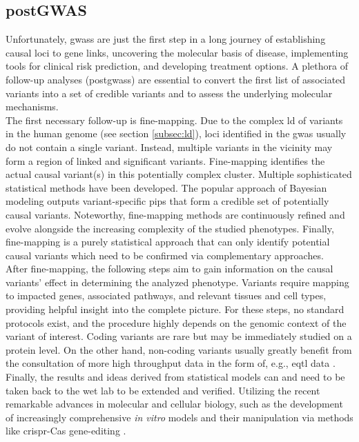     \subsection{postGWAS}
    \label{subsec:gwas_limit}
    Unfortunately, \acp{gwas} are just the first step in a long journey of establishing causal loci to gene links, uncovering the molecular basis of disease, implementing tools for clinical risk prediction, and developing treatment options. A plethora of follow-up analyses (post\acp{gwas}) are essential to convert the first list of associated variants into a set of credible variants and to assess the underlying molecular mechanisms.\\
    The first necessary follow-up is fine-mapping. Due to the complex \ac{ld} of variants in the human genome (see section \ref{subsec:ld}), loci identified in the \ac{gwas} usually do not contain a single variant. Instead, multiple variants in the vicinity may form a region of linked and significant variants. Fine-mapping identifies the actual causal variant(s) in this potentially complex cluster. Multiple sophisticated statistical methods have been developed. The popular approach of Bayesian modeling outputs variant-specific \acp{pip} that form a credible set of potentially causal variants. Noteworthy, fine-mapping methods are continuously refined and evolve alongside the increasing complexity of the studied phenotypes. Finally, fine-mapping is a purely statistical approach that can only identify potential causal variants which need to be confirmed via complementary approaches. \cite{schaidGenomewideAssociationsCandidate2018, uffelmannGenomewideAssociationStudies2021}\\
    After fine-mapping, the following steps aim to gain information on the causal variants' effect in determining the analyzed phenotype. Variants require mapping to impacted genes, associated pathways, and relevant tissues and cell types, providing helpful insight into the complete picture. For these steps, no standard protocols exist, and the procedure highly depends on the genomic context of the variant of interest. Coding variants are rare but may be immediately studied on a protein level. On the other hand, non-coding variants usually greatly benefit from the consultation of more high throughput data in the form of, e.g., \ac{eqtl} data \cite{uffelmannGenomewideAssociationStudies2021}.\\
    Finally, the results and ideas derived from statistical models can and need to be taken back to the wet lab to be extended and verified. Utilizing the recent remarkable advances in molecular and cellular biology, such as the development of increasingly comprehensive \textit{in vitro} models and their manipulation via methods like \ac{crispr}-Cas gene-editing \cite{lichouFunctionalStudiesGWAS2020}.

